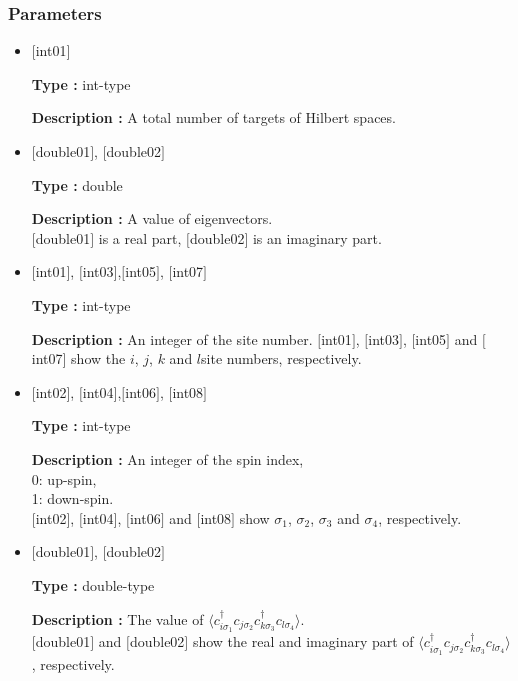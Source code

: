\subsubsection{Parameters}
 \begin{itemize}

  \item  $[$int01$]$

 {\bf Type :} int-type

{\bf Description :}  A total number of targets of Hilbert spaces.

 \item  $[$double01$]$, $[$double02$]$

 {\bf Type :} double 

{\bf Description :} A value of eigenvectors.\\
$[$double01$]$ is a real part, $[$double02$]$ is an imaginary part.\\


  \item  $[$int01$]$, $[$int03$]$,$[$int05$]$, $[$int07$]$

 {\bf Type :} int-type

{\bf Description :} 
An integer of the site number. $[$int01$]$, $[$int03$]$, $[$int05$]$ and $[$int07$]$  show the $i$, $j$, $k$ and $l$site numbers, respectively.
 
  \item  $[$int02$]$, $[$int04$]$,$[$int06$]$, $[$int08$]$

 {\bf Type :} int-type 

{\bf Description :} An integer of the spin index,\\
   0: up-spin,\\
   1: down-spin.\\ 
$[$int02$]$, $[$int04$]$, $[$int06$]$ and $[$int08$]$ show $\sigma_1$, $\sigma_2$, $\sigma_3$ and $\sigma_4$,  respectively. 
  \item  $[$double01$]$, $[$double02$]$

 {\bf Type :} double-type 

{\bf Description :} The value of $\langle c_{i\sigma_1}^{\dagger}c_{j\sigma_2}c_{k\sigma_3}^{\dagger}c_{l\sigma_4}\rangle$.\\
$[$double01$]$ and $[$double02$]$ show the real and imaginary part of $\langle c_{i\sigma_1}^{\dagger}c_{j\sigma_2}c_{k\sigma_3}^{\dagger}c_{l\sigma_4}\rangle$, respectively.

\end{itemize}

\newpage

